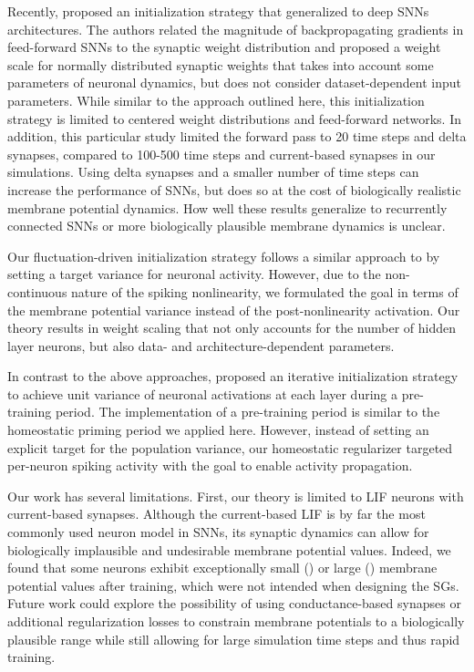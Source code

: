 \documentclass[11pt,a4paper]{article}
\begin{document}
Recently, \citet{Ding2021-ql} proposed an initialization strategy that generalized to deep \acp{SNN} architectures.
The authors related the magnitude of backpropagating gradients in feed-forward \acp{SNN} to the synaptic weight distribution and proposed a weight scale for normally distributed synaptic weights that takes into account some parameters of neuronal dynamics, but does not consider dataset-dependent input parameters. 
While similar to the approach outlined here, this initialization strategy is limited to centered weight distributions and feed-forward networks.
In addition, this particular study limited the forward pass to 20 time steps and delta synapses, compared to 100-500 time steps and current-based synapses in our simulations.
Using delta synapses and a smaller number of time steps can increase the performance of \acp{SNN}, but does so at the cost of biologically realistic membrane potential dynamics.
How well these results generalize to recurrently connected \acp{SNN} or more biologically plausible membrane dynamics is unclear.

Our fluctuation-driven initialization strategy follows a similar approach to \citet{Glorot2010-dj, He2015-kv} by setting a target variance for neuronal activity.
However, due to the non-continuous nature of the spiking nonlinearity, we formulated the goal in terms of the membrane potential variance  instead of the post-nonlinearity activation.
Our theory results in weight scaling that not only accounts for the number of hidden layer neurons, but also data- and architecture-dependent parameters.

In contrast to the above approaches, \citet{Mishkin2015-zd} proposed an iterative initialization strategy to achieve unit variance of neuronal activations at each layer during a pre-training period.
The implementation of a pre-training period is similar to the homeostatic priming period we applied here.
However, instead of setting an explicit target for the population variance, our homeostatic regularizer targeted per-neuron spiking activity with the goal to enable activity propagation.

\medskip
Our work has several limitations.
First, our theory is limited to \ac{LIF} neurons with current-based synapses. 
Although the current-based \ac{LIF} is by far the most commonly used neuron model in \acp{SNN}, its synaptic dynamics can allow for biologically implausible and undesirable membrane potential values. 
Indeed, we found that some neurons exhibit exceptionally small () or large () membrane potential values after training, which were not intended when designing the \acp{SG}.
Future work could explore the possibility of using conductance-based synapses or additional regularization losses to constrain membrane potentials to a biologically plausible range while still allowing for large simulation time steps and thus rapid training.
\end{document}
